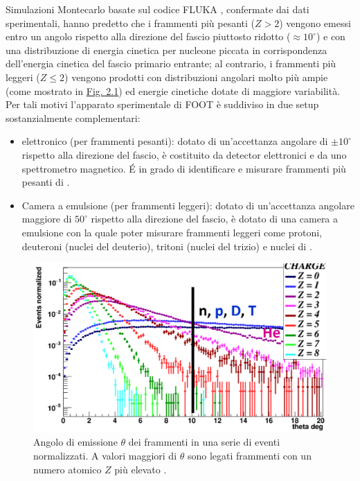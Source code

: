 \documentclass[12pt,a4paper,twoside]{report}
\begin{document}
	Simulazioni Montecarlo basate sul codice FLUKA \cite{Ferrari:2005zk,BOHLEN2014211}, confermate dai dati sperimentali, hanno predetto che i frammenti più pesanti ($Z>2$) vengono emessi entro un angolo rispetto alla direzione del fascio piuttosto ridotto ($\approx10^\circ$) e con una distribuzione di energia cinetica per nucleone piccata in corrispondenza dell'energia cinetica del fascio primario entrante; al contrario, i frammenti più leggeri ($Z\le2$) vengono prodotti con distribuzioni angolari molto più ampie (come mostrato in \hyperref[fig:angular]{Fig. 2.1}) ed energie cinetiche dotate di maggiore variabilità. Per tali motivi l'apparato sperimentale di FOOT è suddiviso in due setup sostanzialmente complementari:
	\begin{itemize}
		\item elettronico (per frammenti pesanti): dotato di un'accettanza angolare di $\pm10^\circ$ rispetto alla direzione del fascio, è costituito da detector elettronici e da uno spettrometro magnetico. \'E in grado di identificare e misurare frammenti più pesanti di .
		\item Camera a emulsione (per frammenti leggeri): dotato di un'accettanza angolare maggiore di $50^\circ$ rispetto alla direzione del fascio, è dotato di una camera a emulsione con la quale poter misurare frammenti leggeri come protoni, deuteroni (nuclei del deuterio), tritoni (nuclei del trizio) e nuclei di .
	\end{itemize}
	\begin{figure}[H]
		\centering
		\includegraphics[width=0.8\linewidth]{angular.png}
		\caption{Angolo di emissione $\theta$ dei frammenti in una serie di eventi normalizzati. A valori maggiori di $\theta$ sono legati frammenti con un numero atomico $Z$ più elevato \cite{slide_spighi}.}
		\label{fig:angular}
	\end{figure}
	
\end{document}
